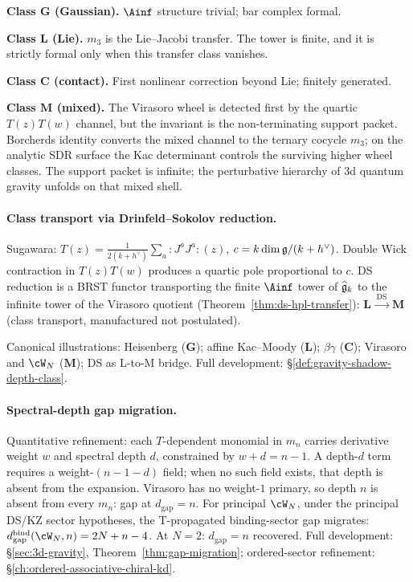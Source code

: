 \textbf{Class $\mathbf{G}$ (Gaussian).}
$\Ainf$ structure trivial; bar complex formal.

\textbf{Class $\mathbf{L}$ (Lie).}
$m_3$ is the Lie--Jacobi transfer. The tower is finite, and it is
strictly formal only when this transfer class vanishes.

\textbf{Class $\mathbf{C}$ (contact).}
First nonlinear correction beyond Lie; finitely generated.

\textbf{Class $\mathbf{M}$ (mixed).}
The Virasoro wheel is detected first by the quartic
$T(z)T(w)$ channel, but the invariant is the non-terminating
support packet.  Borcherds identity converts the mixed channel
to the ternary cocycle \(m_3\); on the analytic SDR surface the
Kac determinant controls the surviving higher wheel classes.
The support packet is infinite; the perturbative hierarchy of
3d quantum gravity unfolds on that mixed shell.

\paragraph{Class transport via Drinfeld--Sokolov reduction.}
Sugawara:
$T(z) = \frac{1}{2(k + h^\vee)} \sum_a {:}J^a J^a{:}(z)$,
$c = k \dim \mathfrak{g}/(k + h^\vee)$. Double Wick contraction in
$T(z) T(w)$ produces a quartic pole proportional to $c$. DS
reduction is a BRST functor transporting the finite $\Ainf$
tower of $\widehat{\mathfrak{g}}_k$ to the infinite tower of the Virasoro
quotient (Theorem~\ref{thm:ds-hpl-transfer}):
$\mathbf{L} \xrightarrow{\;\mathrm{DS}\;} \mathbf{M}$ (class
transport, manufactured not postulated).

Canonical illustrations: Heisenberg ($\mathbf{G}$); affine
Kac--Moody ($\mathbf{L}$); $\beta\gamma$ ($\mathbf{C}$);
Virasoro and $\cW_N$ ($\mathbf{M}$); DS as L-to-M bridge. Full
development: \S\ref{def:gravity-shadow-depth-class}.

\paragraph{Spectral-depth gap migration.}
Quantitative refinement: each $T$-dependent monomial in $m_n$
carries derivative weight $w$ and spectral depth $d$,
constrained by $w + d = n - 1$. A depth-$d$ term requires a
weight-$(n - 1 - d)$ field; when no such field exists, that
depth is absent from the expansion. Virasoro has no weight-$1$
primary, so depth $n$ is absent from every $m_n$: gap at
$d_{\mathrm{gap}} = n$. For principal $\cW_N$, under the
principal DS/KZ sector hypotheses, the T-propagated binding-sector gap migrates:
$d_{\mathrm{gap}}^{\mathrm{bind}}(\cW_N, n) = 2N + n - 4$.
At $N = 2$: $d_{\mathrm{gap}} = n$ recovered. Full development:
\S\ref{sec:3d-gravity}, Theorem~\ref{thm:gap-migration};
ordered-sector refinement:
\S\ref{ch:ordered-associative-chiral-kd}.

